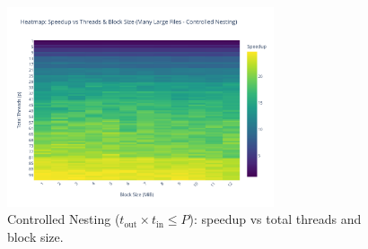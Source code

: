 \documentclass[10pt]{article}
\newcommand{\code}[1]{\texttt{#1}}
\begin{document}
\begin{figure}[H]
    \centering
    \includegraphics[width=0.7\textwidth]{../results/plots/many_large_parallel_right/speedup_matrix_many_large_right.pdf}
    \caption{Controlled Nesting ($t_{\text{out}}\times t_{\text{in}}\le P$): speedup vs total threads and block size.}
    \label{fig:many_large_ctrl}
\end{figure}

\end{document}
